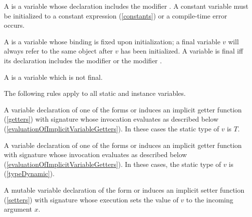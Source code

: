 \documentclass[makeidx]{article}
\begin{document}
\LMHash{}%
A 
is a variable whose declaration includes the modifier \CONST{}.
A constant variable must be initialized to a constant expression (\ref{constants}) or a compile-time error occurs.

\LMHash{}%
A 
is a variable whose binding is fixed upon initialization;
a final variable $v$ will always refer to the same object after $v$ has been initialized.
A variable is final if{}f its declaration includes the modifier \FINAL{} or the modifier \CONST{}.

\LMHash{}%
A 
is a variable which is not final.


\LMHash{}%
The following rules apply to all static and instance variables.

\LMHash{}%
A variable declaration of one of the forms
or 
induces an implicit getter function (\ref{getters}) with signature
whose invocation evaluates as described below
(\ref{evaluationOfImplicitVariableGetters}).
In these cases the static type of $v$ is $T$.

\LMHash{}%
A variable declaration of one of the forms
or 
induces an implicit getter function with signature
whose invocation evaluates as described below
(\ref{evaluationOfImplicitVariableGetters}).
In these cases, the static type of $v$ is \DYNAMIC{}
(\ref{typeDynamic}).

\LMHash{}%
A mutable variable declaration of the form
or 
induces an implicit setter function (\ref{setters}) with signature
whose execution sets the value of $v$ to the incoming argument $x$.
\end{document}
